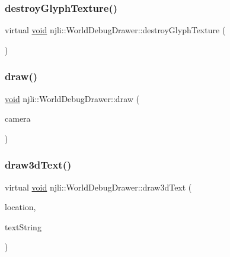 \subsubsection{\texorpdfstring{destroy\+Glyph\+Texture()}{destroyGlyphTexture()}}
{\footnotesize\ttfamily virtual \mbox{\hyperlink{_thread_8h_af1e856da2e658414cb2456cb6f7ebc66}{void}} njli\+::\+World\+Debug\+Drawer\+::destroy\+Glyph\+Texture (\begin{DoxyParamCaption}\item[{dd\+::\+Glyph\+Texture\+Handle}]{ }\end{DoxyParamCaption})\hspace{0.3cm}{\ttfamily [virtual]}}

\mbox{\label{classnjli_1_1_world_debug_drawer_a52ac5a94b12639e5450f77690ab8f5bc}} 
\subsubsection{\texorpdfstring{draw()}{draw()}}
{\footnotesize\ttfamily \mbox{\hyperlink{_thread_8h_af1e856da2e658414cb2456cb6f7ebc66}{void}} njli\+::\+World\+Debug\+Drawer\+::draw (\begin{DoxyParamCaption}\item[{\mbox{\hyperlink{classnjli_1_1_camera}{Camera}} $\ast$}]{camera }\end{DoxyParamCaption})}

\mbox{\label{classnjli_1_1_world_debug_drawer_a76cbaf34350fd41f5fd929e97df5c9a3}} 
\subsubsection{\texorpdfstring{draw3d\+Text()}{draw3dText()}}
{\footnotesize\ttfamily virtual \mbox{\hyperlink{_thread_8h_af1e856da2e658414cb2456cb6f7ebc66}{void}} njli\+::\+World\+Debug\+Drawer\+::draw3d\+Text (\begin{DoxyParamCaption}\item[{const bt\+Vector3 \&}]{location,  }\item[{const char $\ast$}]{text\+String }\end{DoxyParamCaption})\hspace{0.3cm}{\ttfamily [virtual]}}

